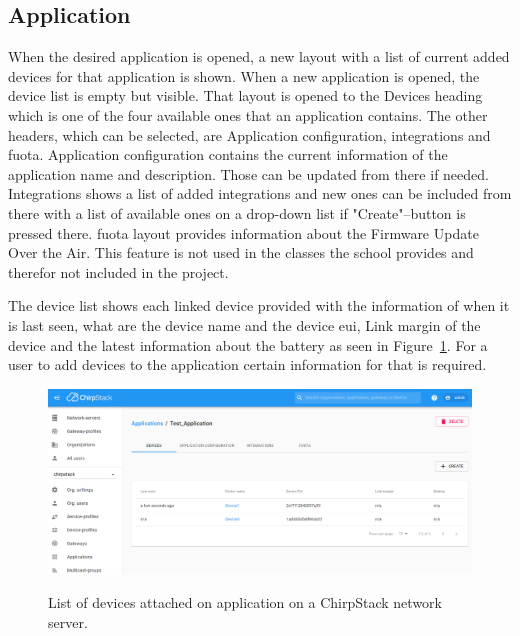 \subsection{Application}
When the desired application is opened, a new layout with a list of current added devices for that application is shown.
When a new application is opened, the device list is empty but visible.
That layout is opened to the Devices heading which is one of the four available ones that an application contains.
The other headers, which can be selected, are Application configuration, integrations and \gls{fuota}.
Application configuration contains the current information of the application name and description.
Those can be updated from there if needed.
Integrations shows a list of added integrations and new ones can be included from there with a list of available ones on a drop-down list if "Create"--button is pressed there.
\gls{fuota} layout provides information about the Firmware Update Over the Air.
This feature is not used in the classes the school provides and therefor not included in the project. 

The device list shows each linked device provided with the information of when it is last seen, what are the device name and the device \gls{eui}, Link margin of the device and the latest information about the battery as seen in Figure~\ref{fig:ChirpStack_application}.
For a user to add devices to the application certain information for that is required.

\begin{figure}[ht]
  \centering
  {\includegraphics[width=\textwidth]{illustration/ChirpStack_application.png}}
  \caption{List of devices attached on application on a ChirpStack network server.}
  \label{fig:ChirpStack_application}
\end{figure}

